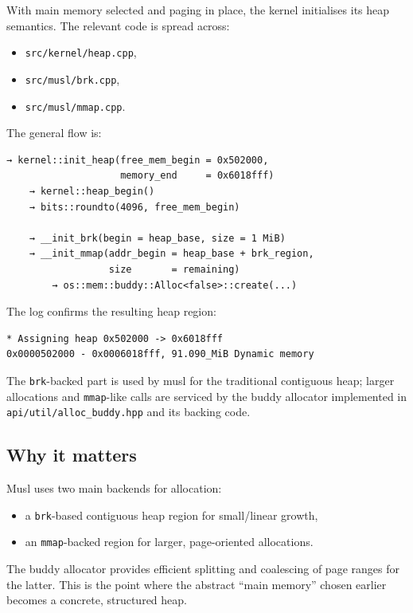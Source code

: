 \documentclass[a4paper,11pt]{article}
\begin{document}
With main memory selected and paging in place, the kernel initialises
its heap semantics. The relevant code is spread across:

\begin{itemize}
  \item \texttt{src/kernel/heap.cpp},
  \item \texttt{src/musl/brk.cpp},
  \item \texttt{src/musl/mmap.cpp}.
\end{itemize}

The general flow is:

\begin{verbatim}
→ kernel::init_heap(free_mem_begin = 0x502000,
                    memory_end     = 0x6018fff)
    → kernel::heap_begin()
    → bits::roundto(4096, free_mem_begin)

    → __init_brk(begin = heap_base, size = 1 MiB)
    → __init_mmap(addr_begin = heap_base + brk_region,
                  size       = remaining)
        → os::mem::buddy::Alloc<false>::create(...)
\end{verbatim}

The log confirms the resulting heap region:

\begin{verbatim}
* Assigning heap 0x502000 -> 0x6018fff
0x0000502000 - 0x0006018fff, 91.090_MiB Dynamic memory
\end{verbatim}

The \texttt{brk}-backed part is used by musl for the traditional
contiguous heap; larger allocations and \texttt{mmap}-like calls are
serviced by the buddy allocator implemented in
\texttt{api/util/alloc\_buddy.hpp} and its backing code.

\subsection{Why it matters}

Musl uses two main backends for allocation:

\begin{itemize}
  \item a \texttt{brk}-based contiguous heap region for small/linear
        growth,
  \item an \texttt{mmap}-backed region for larger, page-oriented
        allocations.
\end{itemize}

The buddy allocator provides efficient splitting and coalescing of page
ranges for the latter. This is the point where the abstract “main
memory” chosen earlier becomes a concrete, structured heap.
\end{document}

